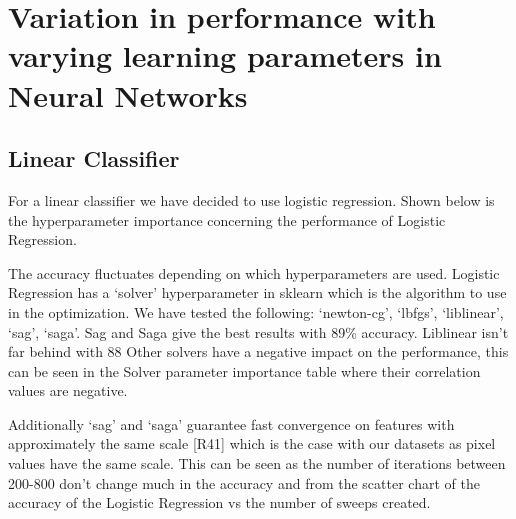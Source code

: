 \documentclass[11pt]{article}
\begin{document}
\newpage
\section{Variation in performance with varying learning parameters in Neural Networks}
\subsection{Linear Classifier}
\cite{SklearnLinearModel}

For a linear classifier we have decided to use logistic regression. 
Shown below is the hyperparameter importance concerning the performance of Logistic Regression.

The accuracy fluctuates depending on which hyperparameters are used. Logistic Regression has a ‘solver’ hyperparameter in sklearn which is the algorithm to use in the optimization. We have tested the following: ‘newton-cg’, ‘lbfgs’, ‘liblinear’, ‘sag’, ‘saga’. Sag and Saga give the best results with 89\% accuracy. Liblinear isn't far behind with 88%
Other solvers have a negative impact on the performance, this can be seen in the Solver parameter importance table where their correlation values are negative.

Additionally ‘sag’ and ‘saga’ guarantee fast convergence on features with approximately the same scale [R41] which is the case with our datasets as pixel values have the same scale. This can be seen as the number of iterations between 200-800 don’t change much in the accuracy and from the scatter chart of the accuracy of the Logistic Regression vs the number of sweeps created.
\end{document}
